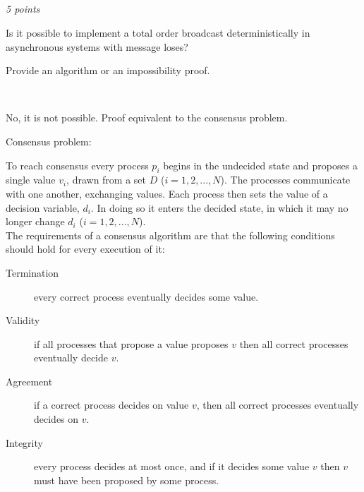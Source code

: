 \documentclass[a4paper]{article}
\newcommand{\points}[1]{\subsection{} \textit{#1 points}\\}
\newcommand{\question}[2][]{
  \parbox[t]{\textwidth}{
    \ifthenelse{\equal{#1}{}}{}{#1)}
    \parbox[t]{0.95\textwidth}{#2}}\\}
\newcommand{\solution}[2][]{
  \ifthenelse{\equal{#1}{} \or \equal{#1}{a}}{\\[3pt]\textit{Solution: }\\[0.1cm]}{}
  \question[#1]{#2}
}
\begin{document}
{  
}


\points{5}
\question{
  Is it possible to implement a total order broadcast
  deterministically in asynchronous systems with message loses?

  Provide an algorithm or an impossibility proof.
}
\solution{
  No, it is not possible. Proof equivalent to the consensus problem.

  Consensus problem:

  To reach consensus every process $p_i$ begins in the undecided
  state and proposes a single value $v_i$, drawn from a set $D$ ($i =
  1, 2, ..., N$). The processes communicate with one another,
  exchanging values. Each process then sets the value of a decision
  variable, $d_i$. In doing so it enters the decided state, in which
  it may no longer change $d_i$ ($i = 1, 2, ..., N$). \\

  The requirements of a consensus algorithm are that the following
  conditions should hold for every execution of it:
  \begin{description}
    \item[Termination] every correct process eventually decides some
      value.
    \item[Validity] if all processes that propose a value proposes $v$
      then all correct processes eventually decide $v$.
    \item[Agreement] if a correct process decides on value $v$, then
      all correct processes eventually decides on $v$.
    \item[Integrity] every process decides at most once, and if it
      decides some value $v$ then $v$ must have been proposed by some
      process.
  \end{description}

}
\end{document}

